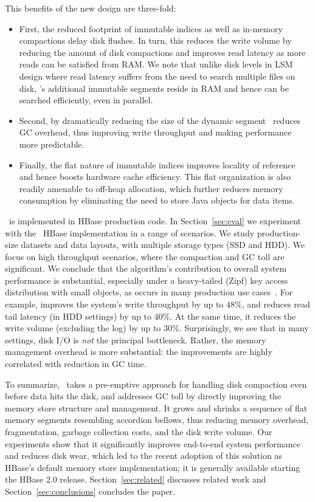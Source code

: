 This benefits of the new design are three-fold:
\begin{itemize} 
 \item First, the reduced footprint of immutable indices as well as in-memory compactions delay disk flushes. In turn, this reduces 
 the write volume by reducing the amount of disk compactions  and improves read latency as more reads can be satisfied from RAM.
We note that unlike disk levels in LSM design where read latency suffers from the need to
search multiple files on disk,  \sys's additional immutable segments reside in RAM and hence can be searched efficiently, even in parallel.
\item Second, by dramatically reducing the size of the dynamic segment  \sys\ reduces GC overhead, thus improving write throughput and making performance more predictable.
\item Finally, the flat nature of immutable indices improves locality of reference and hence boosts hardware cache efficiency. 
This flat organization is also readily amenable to off-heap allocation, which further reduces memory consumption
 by eliminating the need to store Java objects for data items. 
\end{itemize}
 
\sys\ is implemented in HBase production code. In Section~\ref{sec:eval} we experiment with the \sys\ HBase implementation in a range of scenarios.
We study production-size datasets and data layouts, with multiple storage types (SSD and HDD). 
We focus on high throughput scenarios, where the compaction and GC toll are significant. 
We conclude that the algorithm's contribution to overall system performance is substantial, 
especially under a  heavy-tailed (Zipf) key access distribution with 
small objects, as occurs in many production use cases~\cite{Wu2015}. For example, \sys\/ 
improves the system's write throughput by up to $48\%$, and reduces read tail latency 
(in HDD settings)  
by up to $40\%$. At the same time, it reduces the write volume (excluding the log) by up to $30\%$. Surprisingly, we see 
that in many settings, disk I/O is \emph{not} the principal bottleneck. Rather, the memory management 
overhead is more substantial: the improvements are highly correlated with  reduction in GC time. 

To summarize, \sys\ takes a pre-emptive approach for handling disk compaction even before data hits the disk, and addresses GC toll by directly improving the memory store structure and management.
It grows and shrinks a sequence of flat memory segments resembling accordion bellows, 
thus reducing memory overhead, fragmentation, garbage collection costs, and the disk write volume. 
Our experiments show that it significantly improves end-to-end system performance and reduces disk wear, 
which led to the recent adoption of this solution as HBase's default memory store implementation; it is generally available starting the HBase 2.0 release.
 Section~\ref{sec:related} discusses related work 
and Section~\ref{sec:conclusions} concludes the paper.


